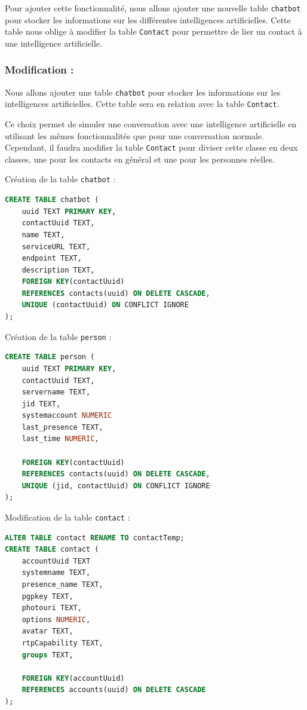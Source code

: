 \documentclass[a4paper,11pt]{article}
\begin{document}
Pour ajouter cette fonctionnalité, nous allons ajouter une nouvelle table \texttt{chatbot} pour stocker les informations sur les différentes intelligences artificielles. Cette table nous oblige à modifier la table \texttt{Contact} pour permettre de lier un contact à une intelligence artificielle.

\subsubsection*{Modification :}

Nous allons ajouter une table \texttt{chatbot} pour stocker les informations sur les intelligences artificielles. Cette table sera en relation avec la table \texttt{Contact}.

Ce choix permet de simuler une conversation avec une intelligence artificielle en utilisant les mêmes fonctionnalités que pour une conversation normale. Cependant, il faudra modifier la table \texttt{Contact} pour diviser cette classe en deux classes, une pour les contacts en général et une pour les personnes réelles.

Création de la table \texttt{chatbot} :

\begin{lstlisting}[language=SQL]
CREATE TABLE chatbot (
	uuid TEXT PRIMARY KEY,
	contactUuid TEXT,
	name TEXT,
	serviceURL TEXT,
	endpoint TEXT,
	description TEXT,
	FOREIGN KEY(contactUuid) 
	REFERENCES contacts(uuid) ON DELETE CASCADE,
	UNIQUE (contactUuid) ON CONFLICT IGNORE
);
\end{lstlisting}

Création de la table \texttt{person} :

\begin{lstlisting}[language=SQL]
CREATE TABLE person (
	uuid TEXT PRIMARY KEY,
	contactUuid TEXT,
	servername TEXT,
	jid TEXT,
	systemaccount NUMERIC
	last_presence TEXT,
	last_time NUMERIC,

	FOREIGN KEY(contactUuid) 
	REFERENCES contacts(uuid) ON DELETE CASCADE,
	UNIQUE (jid, contactUuid) ON CONFLICT IGNORE
);
\end{lstlisting}

Modification de la table \texttt{contact} :

\begin{lstlisting}[language=SQL]
ALTER TABLE contact RENAME TO contactTemp;
CREATE TABLE contact (
	accountUuid TEXT
	systemname TEXT,
	presence_name TEXT,
	pgpkey TEXT,
	photouri TEXT,
	options NUMERIC,
	avatar TEXT,
	rtpCapability TEXT,
	groups TEXT,

	FOREIGN KEY(accountUuid)
	REFERENCES accounts(uuid) ON DELETE CASCADE
);
\end{lstlisting}
\end{document}
